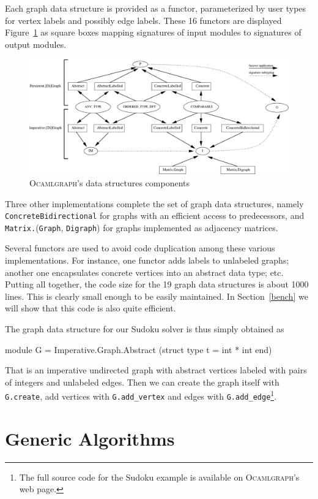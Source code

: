 \documentclass[tfpsymp]{tfp05symp}
\newcommand{\ocamlgraph}{\textsc{Ocamlgraph}\xspace}
\begin{document}
Each graph data structure is provided as a
functor, parameterized by user types for vertex labels and possibly edge
labels. These 16 
functors are displayed Figure~\ref{fig:interfaces} as square boxes
mapping signatures of input modules to signatures of output modules.
\begin{figure}
  \centering
  \includegraphics[width=\textwidth]{interface.eps} 
  \caption{\ocamlgraph's data structures components}\label{fig:interfaces}
\end{figure}
Three other implementations complete the set of graph data structures,
namely \texttt{ConcreteBidirectional} for graphs with an efficient
access to predecessors, and
\texttt{Matrix.}(\texttt{Graph}, \texttt{Digraph}) for graphs
implemented as adjacency matrices.

Several functors are used to avoid code duplication among these
various implementations. For instance, one functor adds labels to
unlabeled graphs; another one encapsulates concrete vertices into an
abstract data type; etc.  Putting all together, the code size for the 19
graph data structures is about 1000 lines. This is clearly small
enough to be easily maintained. In Section~\ref{bench} we will show
that this code is also quite efficient.

The graph data structure for our Sudoku solver is thus simply obtained as
\begin{ocaml}
module G = Imperative.Graph.Abstract
             (struct type t = int * int end) 
\end{ocaml}
That is an imperative undirected graph with abstract vertices labeled
with pairs of integers and unlabeled edges.
Then we can create the graph itself with \texttt{G.create}, add
vertices with \texttt{G.add\_vertex} and edges with
\texttt{G.add\_edge}\footnote{The full source code for the Sudoku example is
  available on \ocamlgraph's web page.}.

\section{Generic Algorithms}\label{algos}
\end{document}
